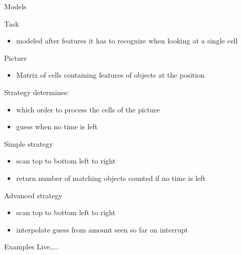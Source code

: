 \documentclass[presentation]{beamer}
\begin{document}
\begin{frame}[label=sec-5]{Models}
\begin{block}{Task}
\begin{itemize}
\item modeled after features it has to recognize when looking at a single cell
\end{itemize}
\end{block}

\begin{block}{Picture}
\begin{itemize}
\item Matrix of cells containing features of objects at the position
\end{itemize}
\end{block}

\begin{block}{Strategy}
determines:
\begin{itemize}
\item which order to process the cells of the picture
\item guess when no time is left
\end{itemize}
\end{block}
\begin{block}{Simple strategy}
\begin{itemize}
\item scan top to bottom left to right
\item return number of matching objects counted if no time is left
\end{itemize}
\end{block}

\begin{block}{Advanced strategy}
\begin{itemize}
\item scan top to bottom left to right
\item interpolate guess from amount seen so far on interrupt
\end{itemize}
\end{block}
\end{frame}

\begin{frame}[label=sec-6]{Examples}
Live\ldots{}..
\end{frame}
\end{document}

